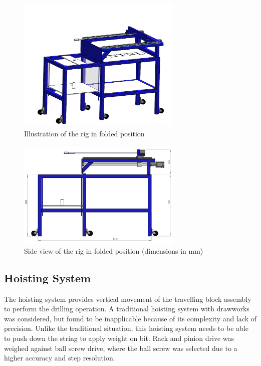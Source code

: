 \begin{figure} [H]
\centering
\includegraphics[width=0.7\textwidth]{figures/SideViewDown.PNG}
\caption{Illustration of the rig in folded position}
\label{fig:SideViewDown}
\end{figure}


\begin{figure} [H]
\centering
\includegraphics[width=0.7\textwidth]{figures/SideDimensionDown.PNG}
\caption{Side view of the rig in folded position (dimensions in mm)}
\label{fig:SideViewDownDim}
\end{figure}




\subsection{Hoisting System}
The hoisting system provides vertical movement of the travelling block assembly to perform the drilling operation. A traditional hoisting system with drawworks was considered, but found to be inapplicable because of its complexity and lack of precision. Unlike the traditional situation, this hoisting system needs to be able to push down the string to apply weight on bit. Rack and pinion drive was weighed against ball screw drive, where the ball screw was selected due to a higher accuracy and step resolution. 

